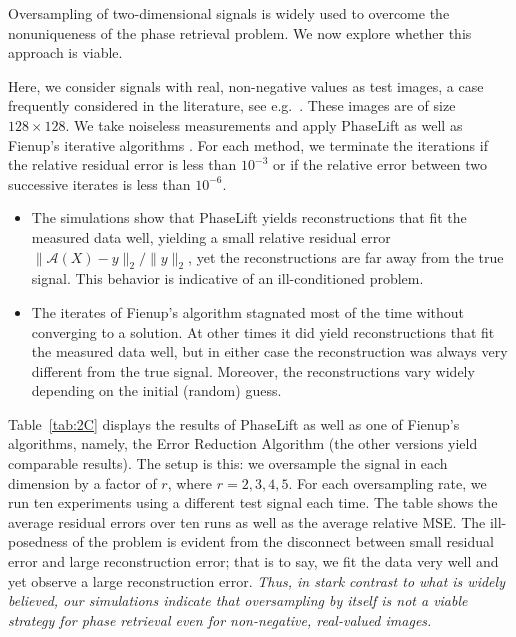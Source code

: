 \documentclass[11pt]{article}
\newcommand{\<}{\langle}
\renewcommand{\>}{\rangle}
\newcommand{\cA}{\mathcal{A}}
\numberwithin{equation}{section}
\begin{document}
Oversampling of two-dimensional signals is widely used to overcome the
nonuniqueness of the phase retrieval problem. We now explore whether
this approach is viable.

Here, we consider signals with real, non-negative values as test
images, a case frequently considered in the literature, see
e.g.~\cite{Mil90,MSC98,MKS00}. These images are of size $128 \times
128$.  We take noiseless measurements and apply PhaseLift %
as well as Fienup's iterative algorithms \cite[Section 4.A]{BCL02}. For
each method, we terminate the iterations if the relative residual
error is less than $10^{-3}$ or if the relative error between two
successive iterates is less than $10^{-6}$.  
\begin{itemize}
\item The simulations show that %
PhaseLift yields reconstructions that
  fit the measured data well, yielding a small relative residual error
  $\|\cA(X) - y\|_2/\|y\|_2$, yet the reconstructions are far away
  from the true signal.  This behavior is indicative of an
  ill-conditioned problem.  
\item The iterates of Fienup's algorithm stagnated most of the time without
  converging to a solution. At other times it did yield
  reconstructions that fit the measured data well, but in either case
  the reconstruction was always very different from the true signal.
  Moreover, the reconstructions vary widely depending on the initial
  (random) guess.
\end{itemize}
Table~\ref{tab:2C} displays the results of PhaseLift %
as well as one of Fienup's algorithms, namely, the Error Reduction Algorithm
\cite[Section 4.~A]{BCL02} (the other versions yield comparable
results).  The setup is this: we oversample the signal in each
dimension by a factor of $r$, where $r=2,3,4,5$.  For each
oversampling rate, we run ten experiments using a different test
signal each time. The table shows the average residual errors over ten
runs as well as the average relative MSE. The ill-posedness of the
problem is evident from the disconnect between small residual error
and large reconstruction error; that is to say, we fit the data very
well and yet observe a large reconstruction error.  {\em Thus, in
  stark contrast to what is widely believed, our simulations indicate
  that oversampling by itself is not a viable strategy for phase
  retrieval even for non-negative, real-valued images.} 
\end{document}
